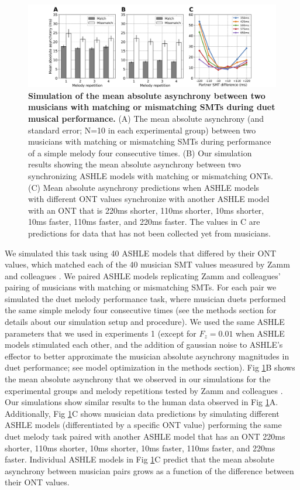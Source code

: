 \documentclass{report}
\begin{document}
\begin{figure}
    \centering
    \includegraphics[width=1.0\textwidth]{figures/fig3_4.png}
    \caption[Simulation of the mean absolute asynchrony between two musicians with matching or mismatching SMTs during duet musical performance]{\textbf{Simulation of the mean absolute asynchrony between two musicians with matching or mismatching SMTs during duet musical performance.} (A) The mean absolute asynchrony (and standard error; N=10 in each experimental group) between two musicians with matching or mismatching SMTs during performance of a simple melody four consecutive times. (B) Our simulation results showing the mean absolute asynchrony between two synchronizing ASHLE models with matching or mismatching ONTs. (C) Mean absolute asynchrony predictions when ASHLE models with different ONT values synchronize with another ASHLE model with an ONT that is 220ms shorter, 110ms shorter, 10ms shorter, 10ms faster, 110ms faster, and 220ms faster. The values in C are predictions for data that has not been collected yet from musicians.}
    \label{f3_4}
\end{figure}

We simulated this task using 40 ASHLE models that differed by their ONT values, which matched each of the 40 musician SMT values measured by Zamm and colleagues \cite{zamm2016endogenous}. We paired ASHLE models replicating Zamm and colleagues' \cite{zamm2016endogenous} pairing of musicians with matching or mismatching SMTs. For each pair we simulated the duet melody performance task, where musician duets performed the same simple melody four consecutive times (see the methods section for details about our simulation setup and procedure). We used the same ASHLE parameters that we used in experiments 1 (except for $F_z = 0.01$ when ASHLE models stimulated each other, and the addition of gaussian noise to ASHLE's effector to better approximate the musician absolute asynchrony magnitudes in duet performance; see model optimization in the methods section). Fig \ref{f3_4}B shows the mean absolute asynchrony that we observed in our simulations for the experimental groups and melody repetitions tested by Zamm and colleagues \cite{zamm2016endogenous}. Our simulations show similar results to the human data observed in Fig \ref{f3_4}A. Additionally, Fig \ref{f3_4}C shows musician data predictions by simulating different ASHLE models (differentiated by a specific ONT value) performing the same duet melody task paired with another ASHLE model that has an ONT 220ms shorter, 110ms shorter, 10ms shorter, 10ms faster, 110ms faster, and 220ms faster. Individual ASHLE models in Fig \ref{f3_4}C predict that the mean absolute asynchrony between musician pairs grows as a function of the difference between their ONT values. 
\end{document}
